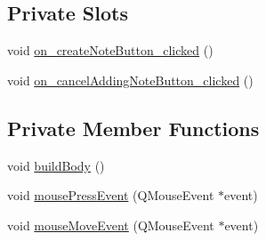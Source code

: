 \subsection*{Private Slots}
\begin{DoxyCompactItemize}
\item 
void \hyperlink{classadd_note_dialog_a67b28dc05851888a45774eb240d6e43d}{on\+\_\+create\+Note\+Button\+\_\+clicked} ()
\item 
void \hyperlink{classadd_note_dialog_af0e53e8f605b12087a3982e53409ca2f}{on\+\_\+cancel\+Adding\+Note\+Button\+\_\+clicked} ()
\end{DoxyCompactItemize}
\subsection*{Private Member Functions}
\begin{DoxyCompactItemize}
\item 
void \hyperlink{classadd_note_dialog_a6081c9e296c649aec4d5fb6828e8ed1d}{build\+Body} ()
\item 
void \hyperlink{classadd_note_dialog_a5479e71fa86229b5d3a2e03ffd3ddbeb}{mouse\+Press\+Event} (Q\+Mouse\+Event $\ast$event)
\item 
void \hyperlink{classadd_note_dialog_a56670c6227c03bc1277f22789e7876e4}{mouse\+Move\+Event} (Q\+Mouse\+Event $\ast$event)
\end{DoxyCompactItemize}

